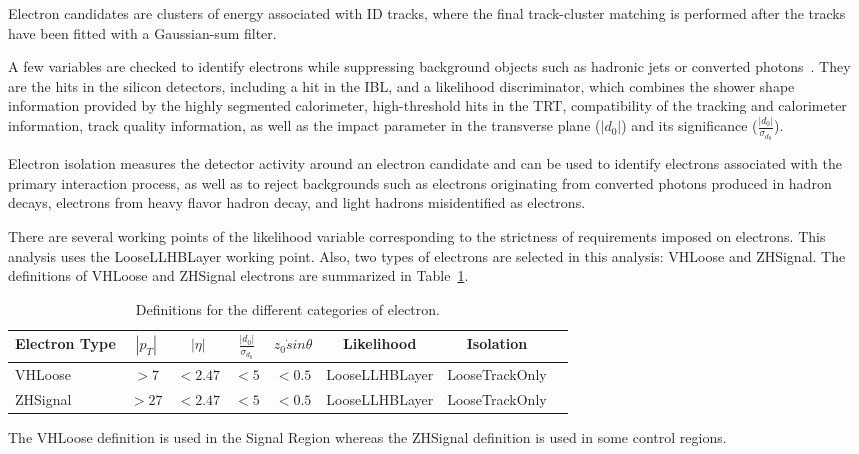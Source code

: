 \par Electron candidates are clusters of energy associated with ID tracks, 
where the final track-cluster matching is performed after the tracks have been fitted with a Gaussian-sum filter.
\par A few variables are checked to identify electrons while suppressing background objects such as hadronic jets or converted photons~\cite{ATL-PHYS-PUB-2015-041}. 
They are the hits in the silicon detectors, including a hit in the IBL, and a likelihood discriminator, 
which combines the shower shape information provided by the highly segmented calorimeter, high-threshold hits in the TRT, 
compatibility of the tracking and calorimeter information, track quality information, 
as well as the impact parameter in the transverse plane ($|d_0|$) and its significance ($\frac{|d_0|}{\sigma_{d_0}}$).
\par Electron isolation measures the detector activity around an electron candidate and can be used to identify electrons associated with the primary interaction process, as well as to reject backgrounds such as electrons originating from converted photons produced in hadron decays, 
electrons from heavy flavor hadron decay, and light hadrons misidentified as electrons.
\par There are several working points of the likelihood variable corresponding to the strictness of requirements imposed on electrons. 
This analysis uses the LooseLLHBLayer working point. 
Also, two types of electrons are selected in this analysis: VHLoose and ZHSignal. The definitions of VHLoose and ZHSignal electrons are summarized in Table~\ref{tab:el}.

\begin{table}[tbh]
    \centering
    \begin{tabular}{|l|c|c|c|c|c|c|c}
        \hline
        Electron Type & $|p_T|$ & $|\eta|$ & $\frac{|d_0|}{\sigma_{d_0}}$ & $z_0\dot sin\theta$ & Likelihood & Isolation \\
        \hline
        VHLoose &$> 7$&$< 2.47$&$<5$&$<0.5$&LooseLLHBLayer&LooseTrackOnly \\
        \hline
        ZHSignal&$>27$&$<2.47$&$<5$&$<0.5$&LooseLLHBLayer&LooseTrackOnly \\
        \hline
    \end{tabular}
    \caption{Definitions for the different categories of electron.}
    \label{tab:el}
\end{table}

\par The VHLoose definition is used in the Signal Region whereas the ZHSignal definition is used in some control regions.
 
